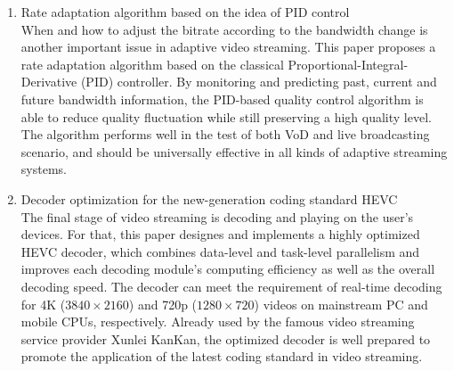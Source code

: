 \begin{eabstract}
\begin{enumerate}
\item {Rate adaptation algorithm based on the idea of PID control}\\
When and how to adjust the bitrate according to the bandwidth change is another important issue in adaptive video streaming. This paper proposes a rate adaptation algorithm based on the classical Proportional-Integral-Derivative (PID) controller. By monitoring and predicting past, current and future bandwidth information, the PID-based quality control algorithm is able to reduce quality fluctuation while still preserving a high quality level. The algorithm performs well in the test of both VoD and live broadcasting scenario, and should be universally effective in all kinds of adaptive streaming systems.
\item {Decoder optimization for the new-generation coding standard HEVC}\\
The final stage of video streaming is decoding and playing on the user's devices. For that, this paper designes and implements a highly optimized HEVC decoder, which combines data-level and task-level parallelism and improves each decoding module's computing efficiency as well as the overall decoding speed. The decoder can meet the requirement of real-time decoding for 4K ($3840 \times 2160$) and 720p ($1280 \times 720$) videos on mainstream PC and mobile CPUs, respectively. Already used by the famous video streaming service provider Xunlei KanKan, the optimized decoder is well prepared to promote the application of the latest coding standard in video streaming.
\end{enumerate}
\end{eabstract}
